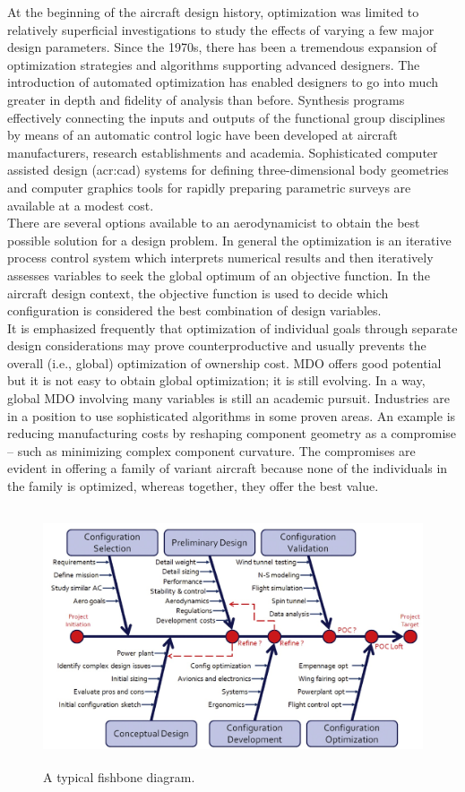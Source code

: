 At the beginning of the aircraft design history, optimization was limited to relatively superficial investigations to study the effects of varying a few major design parameters. 
Since the 1970s, there has been a tremendous expansion of optimization strategies and algorithms supporting advanced designers. The introduction of automated optimization has enabled designers to go into much greater in depth and fidelity of analysis than before. Synthesis programs effectively connecting the inputs and outputs of the functional group disciplines by means of an automatic control logic have been developed at aircraft manufacturers, research establishments and academia. Sophisticated computer assisted design (\gls{acr:cad}) systems for defining three-dimensional body geometries and computer graphics tools for rapidly preparing parametric surveys are available at a modest cost.\\
There are several options available to an aerodynamicist to obtain the best possible solution for a design problem. In general the optimization is an iterative process control system which interprets numerical results and then iteratively assesses variables to seek the global optimum of an objective function. In the aircraft design context, the objective function is used to decide which configuration is considered the best combination of design variables.\cite{torenbeek2013advanced} \\
It is emphasized frequently that optimization of individual goals through separate design considerations may prove counterproductive and usually prevents the overall (i.e., global) optimization of ownership cost.  \gls{MDO} offers good potential but it is not easy to obtain global optimization; it is still evolving. In a way, global  \gls{MDO} involving many variables is still an academic pursuit. Industries are in a position to use sophisticated algorithms in some proven areas. An example is reducing manufacturing costs by reshaping component geometry as a compromise – such as minimizing complex component curvature. The compromises are evident in offering a family of variant aircraft because none of the individuals in the family is optimized, whereas together, they offer the best value.
\noindent \\

\begin{figure}[H]
\centering
\includegraphics[height=7.6cm]{Immagini/Fishbone}
\caption{A typical fishbone diagram.}
\label{comp}
\end{figure}
